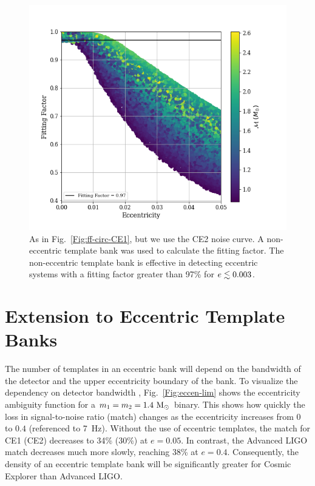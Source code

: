 \begin{figure}
    \includegraphics[width=1.15\columnwidth]{Figures/3G-bns-search-prospects/non-eccen-ff-mchirp-CE2.png}
    \caption{As in Fig.~\ref{Fig:ff-circ-CE1}, but we use the CE2 noise curve. A non-eccentric template bank was used to calculate the fitting factor. The non-eccentric template bank is effective in detecting eccentric systems with a fitting factor greater than 97\% for $e \lesssim 0.003$.}
\label{Fig:ff-circ-CE2}
\end{figure}

\section{\label{s:3G-ecc} Extension to Eccentric Template Banks}

The number of templates in an eccentric bank will depend on the bandwidth of the detector and the upper eccentricity boundary of the bank. To visualize the dependency on detector bandwidth , Fig.~\ref{Fig:eccen-lim} shows the eccentricity ambiguity function for a $m_1 = m_2 = 1.4~\mathrm{M}_{\odot}$ binary. This shows how quickly the loss in signal-to-noise ratio (match) changes as the  eccentricity increases from $0$ to $0.4$ (referenced to 7~Hz). Without the use of eccentric templates, the match for CE1 (CE2) decreases to 34\% (30\%) at $e = 0.05$. In contrast, the Advanced LIGO match decreases much more slowly, reaching 38\% at $e = 0.4$. Consequently, the density of an eccentric template bank will be significantly greater for Cosmic Explorer than Advanced LIGO.

